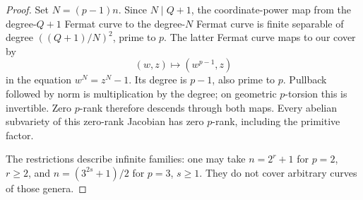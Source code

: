\documentclass[11pt]{article}
\begin{document}
\begin{proof}
Set $N=(p-1)n$. Since $N\mid Q+1$, the coordinate-power
map from the degree-$Q+1$ Fermat curve to the degree-$N$
Fermat curve is finite separable of degree
$((Q+1)/N)^2$, prime to $p$. The latter Fermat curve maps
to our cover by
\[
                     (w,z)\longmapsto (w^{p-1},z)
\]
in the equation $w^N=z^N-1$. Its degree is $p-1$, also
prime to $p$. Pullback followed by norm is multiplication
by the degree; on geometric $p$-torsion this is invertible.
Zero $p$-rank therefore descends through both maps.
Every abelian subvariety of this zero-rank Jacobian has
zero $p$-rank, including the primitive factor.

The restrictions describe infinite families: one may take
$n=2^r+1$ for $p=2$, $r\ge2$, and
$n=(3^{2s}+1)/2$ for $p=3$, $s\ge1$. They do not cover
arbitrary curves of those genera.
\end{proof}
\end{document}
